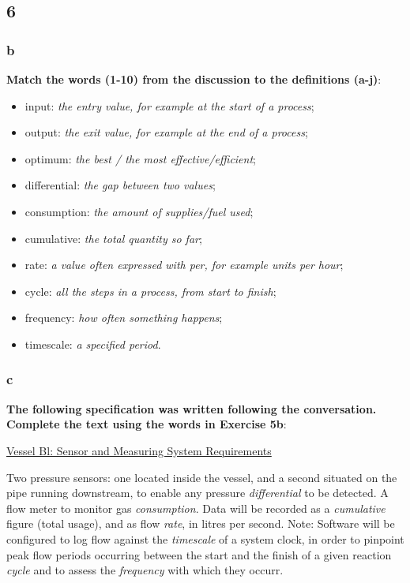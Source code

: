 \subsection{6}

\subsubsection{b} 

\textbf{Match the words (1-10) from the discussion to the definitions (a-j)}:

\begin{itemize}

\item input: \textit{the entry value, for example at the start of a process};
\item output: \textit{the exit value, for example at the end of a process};
\item optimum: \textit{the best / the most effective/efficient};
\item differential: \textit{the gap between two values};
\item consumption: \textit{the amount of supplies/fuel used};
\item cumulative: \textit{the total quantity so far};
\item rate: \textit{a value often expressed with per, for example units per hour};
\item cycle: \textit{all the steps in a process, from start to finish};
\item frequency: \textit{how often something happens};
\item timescale: \textit{a specified period}.

\end{itemize}

\subsubsection{c}

\textbf{The following specification was written following the conversation. Complete the text using the words in Exercise 5b}:

\underline{Vessel Bl: Sensor and Measuring System Requirements}

Two pressure sensors: one located inside the vessel, and a second situated on the pipe running downstream, to enable any pressure \textit{differential} to be detected.
A flow meter to monitor gas \textit{consumption}. Data will be recorded as a \textit{cumulative} figure (total usage), and as flow \textit{rate}, in litres per second. Note: Software will be configured to log flow against the \textit{timescale} of a system clock, in order to pinpoint peak flow periods occurring between the start and the finish of a given reaction \textit{cycle} and to assess the \textit{frequency} with which they occurr.

